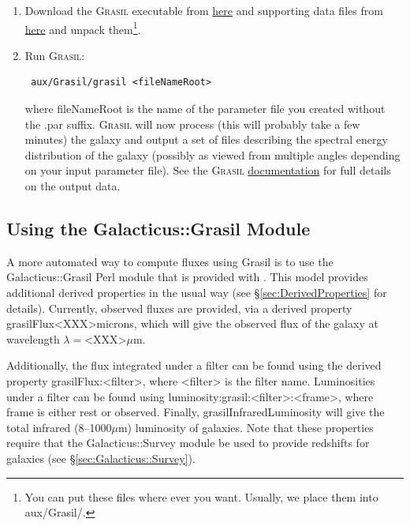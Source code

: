 \begin{enumerate}
 \item Download the {\normalfont \scshape Grasil} executable from \href{http://users.obs.carnegiescience.edu/abenson/galacticus/tools/grasil}{here} and supporting data files from \href{http://adlibitum.oat.ts.astro.it/silva/grasil/download.htm}{here} and unpack them\footnote{You can put these files where ever you want. Usually, we place them into {\normalfont \ttfamily aux/Grasil/}.}.
 \item Run {\normalfont \scshape Grasil}:
\begin{verbatim}
 aux/Grasil/grasil <fileNameRoot>
\end{verbatim}
where {\normalfont \ttfamily fileNameRoot} is the name of the parameter file you created without the {\normalfont \ttfamily .par} suffix. {\normalfont \scshape Grasil} will now process (this will probably take a few minutes) the galaxy and output a set of files describing the spectral energy distribution of the galaxy (possibly as viewed from multiple angles depending on your input parameter file). See the {\normalfont \scshape Grasil} \href{http://adlibitum.oat.ts.astro.it/silva/grasil/grasil.doc}{documentation} for full details on the output data.
\end{enumerate}

\subsection{Using the {\normalfont \ttfamily Galacticus::Grasil} Module}

A more automated way to compute fluxes using {\normalfont \ttfamily Grasil} is to use the {\normalfont \ttfamily Galacticus::Grasil} Perl module that is provided with \glc. This model provides additional derived properties in the usual way (see \S\ref{sec:DerivedProperties} for details). Currently, observed fluxes are provided, via a derived property {\normalfont \ttfamily grasilFlux\textless XXX\textgreater microns}, which will give the observed flux of the galaxy at wavelength $\lambda=${\normalfont \ttfamily\textless XXX\textgreater}$\mu$m.

Additionally, the flux integrated under a filter can be found using the derived property {\normalfont \ttfamily grasilFlux:\textless filter\textgreater}, where {\normalfont \ttfamily \textless filter\textgreater} is the filter name. Luminosities under a filter can be found using {\normalfont \ttfamily luminosity:grasil:\textless filter\textgreater:\textless frame\textgreater}, where {\normalfont \ttfamily frame} is either {\normalfont \ttfamily rest} or {\normalfont \ttfamily observed}. Finally, {\normalfont \ttfamily grasilInfraredLuminosity} will give the total infrared (8--1000$\mu$m) luminosity of galaxies. Note that these properties require that the {\normalfont \ttfamily Galacticus::Survey} module be used to provide redshifts for galaxies (see \S\ref{sec:Galacticus::Survey}).

